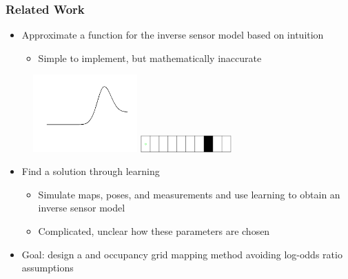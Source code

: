 \documentclass[11pt,professionalfonts,hyperref={pdftex,pdfpagemode=none,pdfstartview=FitH}]{beamer}
\renewcommand{\emph}[1]{\textit{\textbf{\color{blue}{#1}}}}
\begin{document}
\begin{frame}
\frametitle{Related Work }

\begin{minipage}[t]{7.0cm}
\begin{itemize}
	\item Approximate a function for the inverse sensor model based on intuition
	\begin{itemize}
		\item Simple to implement, but mathematically inaccurate
	\end{itemize}
\end{itemize}
\end{minipage}
\begin{minipage}[t]{3.0cm}
\begin{figure}[!htbp]
\centerline{
    \vspace*{-0.5cm}
    \includegraphics[width=4.0cm]{Approx_ISM_shortened.png}\hspace*{0.1cm}
    }
\centerline{
    \includegraphics[width=3.5cm]{1D_True_Grid.png}
    }
		\end{figure}
\end{minipage}
\vspace*{-0.5cm}
\begin{itemize}
	\item Find a solution through learning
	\begin{itemize}
		\item Simulate maps, poses, and measurements and use learning to obtain an inverse sensor model
		\item Complicated, unclear how these parameters are chosen
	\end{itemize}
	\item Goal: design a \emph{simple} and \emph{accurate} occupancy grid mapping method avoiding log-odds ratio assumptions
\end{itemize}


\end{frame}
\end{document}
